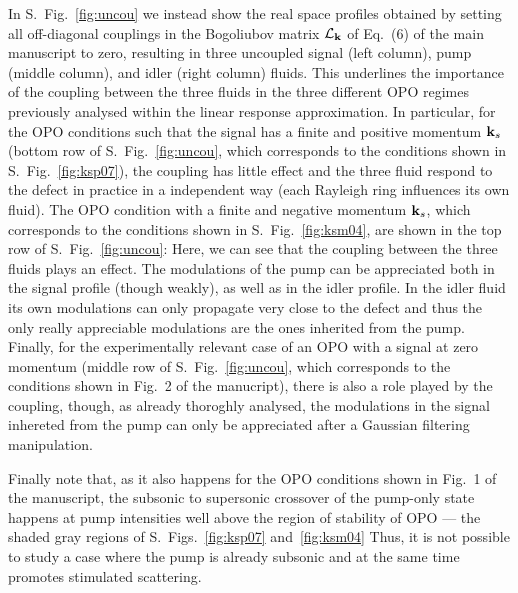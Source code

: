 In S.~Fig.~\ref{fig:uncou} we instead show the real space profiles
obtained by setting all off-diagonal couplings in the Bogoliubov
matrix $\mathcal{L}_{{\mathbf k}}$ of Eq.~(6) of the main manuscript to
zero, resulting in three uncoupled signal (left column), pump (middle
column), and idler (right column) fluids. This underlines the
importance of the coupling between the three fluids in the three
different OPO regimes previously analysed within the linear response
approximation. In particular, for the OPO conditions such that the
signal has a finite and positive momentum ${\mathbf k}_s$ (bottom row of
S.~Fig.~\ref{fig:uncou}, which corresponds to the conditions shown in
S.~Fig.~\ref{fig:ksp07}), the coupling has little effect and the three
fluid respond to the defect in practice in a independent way (each
Rayleigh ring influences its own fluid). The OPO condition with a
finite and negative momentum ${\mathbf k}_s$, which corresponds to the
conditions shown in S.~Fig.~\ref{fig:ksm04}, are shown in the top row
of S.~Fig.~\ref{fig:uncou}: Here, we can see that the coupling between
the three fluids plays an effect. The modulations of the pump can be
appreciated both in the signal profile (though weakly), as well as in
the idler profile. In the idler fluid its own modulations can only
propagate very close to the defect and thus the only really
appreciable modulations are the ones inherited from the pump. Finally,
for the experimentally relevant case of an OPO with a signal at zero
momentum (middle row of S.~Fig.~\ref{fig:uncou}, which corresponds to
the conditions shown in Fig.~2 of the manucript), there is also a role
played by the coupling, though, as already thoroghly analysed, the
modulations in the signal inhereted from the pump can only be
appreciated after a Gaussian filtering manipulation.


Finally note that, as it also happens for the OPO conditions shown in
Fig.~1 of the manuscript, the subsonic to supersonic crossover of the
pump-only state~\cite{Amo_2009} happens at pump intensities well above
the region of stability of OPO --- the shaded gray regions of
S.~Figs.~\ref{fig:ksp07} and~\ref{fig:ksm04} Thus, it is not possible
to study a case where the pump is already subsonic and at the same
time promotes stimulated scattering.




